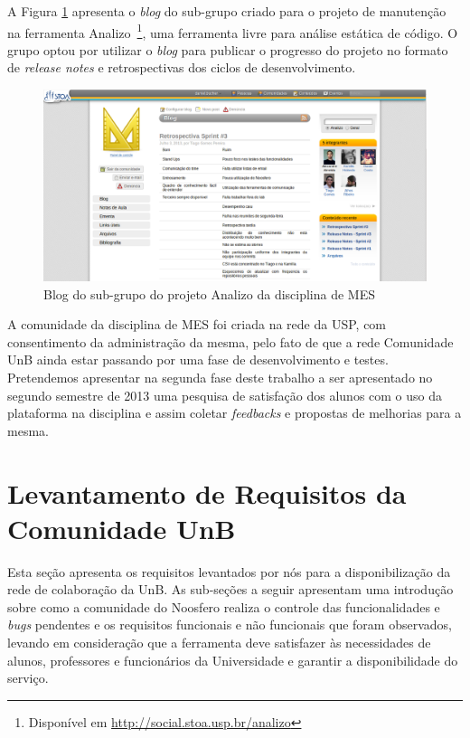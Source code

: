 A Figura \ref{analizo} apresenta o \textit{blog} do sub-grupo
criado para o projeto de manutenção na ferramenta Analizo~\footnote{Disponível
em \url{http://social.stoa.usp.br/analizo}}, uma ferramenta livre
para análise estática de código. O grupo optou por utilizar o \textit{blog}
para publicar o progresso do projeto no formato de \textit{release notes} e
retrospectivas dos ciclos de desenvolvimento.

\begin{figure}[h]
	\centering
	\includegraphics[keepaspectratio=true,scale=0.3]
	  {figuras/analizo.eps}
	\caption{Blog do sub-grupo do projeto Analizo da disciplina de MES }
	\label{analizo}
\end{figure}

A comunidade da disciplina de MES foi criada na rede da USP, com consentimento
da administração da mesma, pelo fato de que a rede Comunidade UnB ainda estar
passando por uma fase de desenvolvimento e testes. Pretendemos apresentar
na segunda fase deste trabalho a ser apresentado no segundo semestre de 2013
uma pesquisa de satisfação dos alunos com o uso da plataforma na disciplina e
assim coletar \textit{feedbacks} e propostas de melhorias para a mesma. 


\section{Levantamento de Requisitos da Comunidade UnB}
\label{requisitos}

Esta seção apresenta os requisitos levantados por nós para a disponibilização
da rede de colaboração da UnB.
%
As sub-seções a seguir apresentam uma introdução sobre como a comunidade
do Noosfero realiza o controle das funcionalidades e \textit{bugs} pendentes e
os requisitos funcionais e não funcionais que foram observados, levando
em consideração que a ferramenta deve satisfazer às necessidades de alunos,
professores e funcionários da Universidade e garantir a disponibilidade do
serviço.

